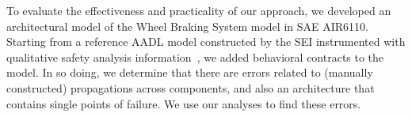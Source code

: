 To evaluate the effectiveness and practicality of our approach, we developed an architectural model of the Wheel Braking System model in SAE AIR6110.  Starting from a reference AADL model constructed by the SEI instrumented with qualitative safety analysis information~\cite{SEI:AADL}, we added behavioral contracts to the model.  In so doing, we determine that there are errors related to (manually constructed) propagations across components, and also an architecture that contains single points of failure.  We use our analyses to find these errors.




